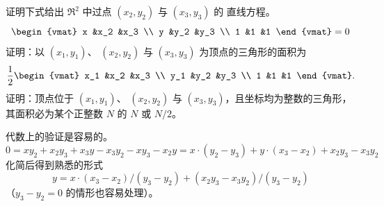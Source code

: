 \begin{exercises}
  \recommended \item
    \begin{exparts}
      \partsitem 证明下式给出 \( \Re^2 \) 中过点
        \( (x_2,y_2) \) 与 \( (x_3,y_3) \) 的
        直线方程。
        \begin{equation*}
          \begin{vmat}
            x    &x_2 &x_3  \\
            y    &y_2 &y_3  \\
            1    &1   &1
          \end{vmat}=0
        \end{equation*}
      \partsitem \cite{Monthly55p249}
        证明：以 \( (x_1,y_1) \)、
        \( (x_2,y_2) \) 与 \( (x_3,y_3) \) 为顶点的三角形的面积为
        \begin{equation*}
          \frac{1}{2}
          \begin{vmat}
            x_1  &x_2 &x_3  \\
            y_1  &y_2 &y_3  \\
            1    &1   &1
          \end{vmat}.
        \end{equation*}
      \partsitem \cite{MathMag73p286}
        证明：顶点位于 \( (x_1,y_1) \)、
        \( (x_2,y_2) \) 与 \( (x_3,y_3) \)，且坐标均为整数的三角形，
        其面积必为某个正整数 \( N \) 的 \( N \) 或 \( N/2 \)。
    \end{exparts}
    \begin{answer}
      \begin{exparts}
        \partsitem 代数上的验证是容易的。
        \begin{equation*}
          0
          =xy_2+x_2y_3+x_3y-x_3y_2-xy_3-x_2y 
          =x\cdot (y_2-y_3)+y\cdot (x_3-x_2)+x_2y_3-x_3y_2 
        \end{equation*}
        化简后得到熟悉的形式
        \begin{equation*}
          y=x\cdot (x_3-x_2)/(y_3-y_2)+(x_2y_3-x_3y_2)/(y_3-y_2)
        \end{equation*}
        （$y_3-y_2=0$ 的情形也容易处理）。


\end{exparts}
\end{answer}
\end{exercises}
